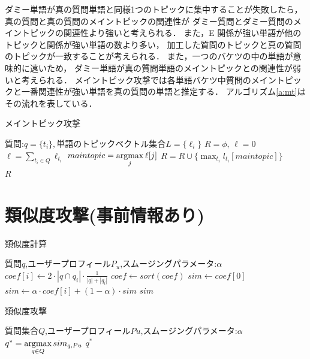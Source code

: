 \documentclass[master]{suribt}
\theoremstyle{definition}
\newcommand{\argmax}{\mathop{\rm argmax}\limits}
\begin{document}
 ダミー単語が真の質問単語と同様1つのトピックに集中することが失敗したら，
 真の質問と真の質問のメイントピックの関連性が
 ダミー質問とダミー質問のメイントピックの関連性より強いと考えられる．
 また，E
 関係が強い単語が他のトピックと関係が強い単語の数より多い，
 加工した質問のトピックと真の質問のトピックが一致することが考えられる．
 また，一つのバケツの中の単語が意味的に遠いため，
 ダミー単語が真の質問単語のメイントピックとの関連性が弱いと考えられる．
 メイントピック攻撃では各単語バケツ中質問のメイントピックと一番関連性が強い単語を真の質問の単語と推定する．
 アルゴリズム\ref{a:mt}はその流れを表している．

 \begin{algorithm}
 \caption{メイントピック攻撃}
 \begin{algorithmic}[1]
  \Require 質問:$q=\{t_i\},$単語のトピックベクトル集合$L=\{\ell_i\}$
  \State $R=\phi, \, \ell=0$
  \State $\ell=\sum_{t_i \in Q}\ell_{t_i}$
  \State $maintopic = \argmax_j \ell[j]$
  \State $R=R \cup \{\max_{t_i}l_{t_i}[maintopic]\}$
  \EndFor　\\
  \Return $R$
 \end{algorithmic}
 \label{a:mt}
 \end{algorithm}

 \section{類似度攻撃\cite{simattack2016}(事前情報あり)}
 \begin{algorithm}
 \caption{類似度計算}
 \begin{algorithmic}[1]
  \Require 質問$q$,ユーザープロフィール$P_u$,スムージングパラメータ:$\alpha$
  \State $coef[i] \leftarrow 2 \cdot |q \cap q_i| \cdot \frac{1}{|q|+|q_i|}$
  \EndFor
  \State $coef \gets sort(coef)$
  \State $sim \gets coef[0]$
  \State $sim \gets \alpha \cdot coef[i] + (1 - \alpha) \cdot sim$
  \EndFor
  \Ensure $sim$
 \end{algorithmic}
 \end{algorithm}
 
 \begin{algorithm}
 \caption{類似度攻撃}
 \begin{algorithmic}[1]
   \Require 質問集合$Q$,ユーザープロフィール$Pu$,スムージングパラメータ:$\alpha$
   \State $q^* = \argmax_{q \in Q}sim_{q,Pu}$
   \Ensure $q^*$
 \end{algorithmic}
 \end{algorithm}
\end{document}
